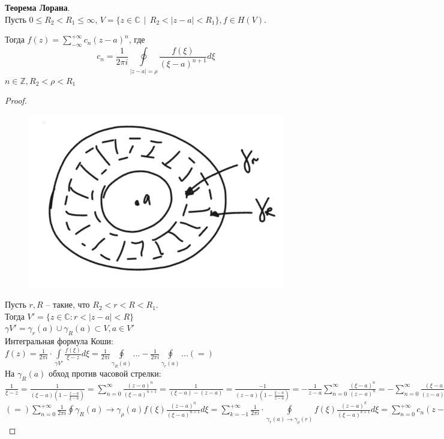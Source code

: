 \textbf{Теорема Лорана}.\\[2mm]
Пусть $0\le R_2 < R_1 \le \infty$, $V = \{z\in\mathbb{C} ~~|~~ R_2 < |z - a| < R_1\}, f\in H(V)$.

Тогда $f(z) = \sum\limits_{-\infty}^{+\infty}c_n (z - a)^n$, где
$$
c_n = \frac{1}{2\pi i}\oint\limits_{|z - a| = \rho} \frac{f(\xi)}{(\xi - a)^{n + 1}} d\xi
$$
$n\in\mathbb{Z}, R_2 < \rho < R_1$

\begin{proof}
    \ \\
    
    \begin{figure}[h]
        \centering
        \includegraphics[width=0.4\linewidth]{answers/img/ans14.png}
    \end{figure}
    Пусть $r, R$ -- такие, что $R_2<r<R<R_1$.\\
    Тогда $V'=\{z\in \mathbb{C}: r<|z-a|<R\}$\\
    $\gamma V'=\gamma_r(a)\cup \gamma_R(a)\subset V, a\in V'$\\
    Интегральная формула Коши: $f(z)=\frac{1}{2\pi i}\cdot \int\limits_{\gamma V'}\frac{f(\xi)}{\xi-z}d\xi = \frac{1}{2\pi i}\oint\limits_{\gamma_R(a)}...-\frac{1}{2\pi i}\oint\limits_{\gamma_r(a)}... (=)$\\
    На $\gamma_R(a)$ обход против часовой стрелки:\\
    $\frac{1}{\xi-z}=\frac{1}{(\xi-a)(1-\frac{z-a}{\xi-a})}=\sum_{n=0}^\infty \frac{(z-a)^n}{(\xi-a)^{n+1}} = \frac{1}{(\xi-a)-(z-a)}=\frac{-1}{(z-a)(1-\frac{\xi-a}{z-a})}=-\frac{1}{z-a}\sum_{n=0}^\infty \frac{(\xi-a)^n}{(z-a)^n}=-\sum_{n=0}^\infty \frac{(\xi-a)^n}{(z-a)^{n+1}} = -\sum_{k=-1}^{-\infty} \frac{(z-a)^k}{(\xi-a)^{k+1}}$\\
    $(=) \sum_{n=0}^{+\infty} \frac{1}{2\pi i} \oint\limits{\gamma_R(a)\to\gamma_\rho(a)}f(\xi) \frac{(z-a)^n}{(\xi-a)^{n+1}}d\xi = \sum_{k=-1}^{+\infty}\frac{1}{2\pi i}\cdot \oint\limits_{\gamma_r(a)\to \gamma_\rho(r)}f(\xi)\frac{(z-a)^k}{(\xi-a)^{k+1}}d\xi = \sum\limits_{n=0}^{+\infty} c_n(z-a)^n+\sum_{k=-1}^{-\infty}c_k(z-a)^{-k}$ 
    
\end{proof}

